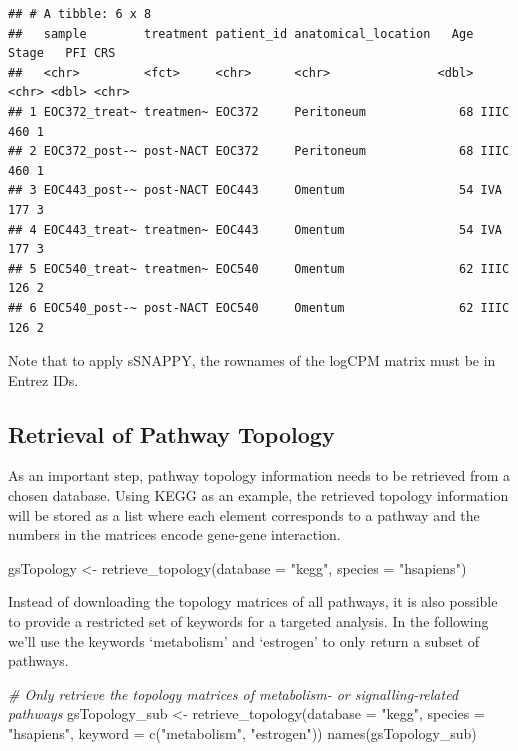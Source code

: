 \documentclass[9pt,a4paper,]{extarticle}
\newenvironment{Shaded}{\begin{snugshade}}{\end{snugshade}}
\newcommand{\AttributeTok}[1]{\textcolor[rgb]{0.77,0.63,0.00}{#1}}
\newcommand{\CommentTok}[1]{\textcolor[rgb]{0.56,0.35,0.01}{\textit{#1}}}
\newcommand{\FunctionTok}[1]{\textcolor[rgb]{0.00,0.00,0.00}{#1}}
\newcommand{\NormalTok}[1]{#1}
\newcommand{\OtherTok}[1]{\textcolor[rgb]{0.56,0.35,0.01}{#1}}
\newcommand{\StringTok}[1]{\textcolor[rgb]{0.31,0.60,0.02}{#1}}
\begin{document}
\begin{verbatim}
## # A tibble: 6 x 8
##   sample        treatment patient_id anatomical_location   Age Stage   PFI CRS  
##   <chr>         <fct>     <chr>      <chr>               <dbl> <chr> <dbl> <chr>
## 1 EOC372_treat~ treatmen~ EOC372     Peritoneum             68 IIIC    460 1    
## 2 EOC372_post-~ post-NACT EOC372     Peritoneum             68 IIIC    460 1    
## 3 EOC443_post-~ post-NACT EOC443     Omentum                54 IVA     177 3    
## 4 EOC443_treat~ treatmen~ EOC443     Omentum                54 IVA     177 3    
## 5 EOC540_treat~ treatmen~ EOC540     Omentum                62 IIIC    126 2    
## 6 EOC540_post-~ post-NACT EOC540     Omentum                62 IIIC    126 2
\end{verbatim}

Note that to apply sSNAPPY, the rownames of the logCPM matrix must be in Entrez IDs.

\hypertarget{retrieval-of-pathway-topology}{%
\subsection{Retrieval of Pathway Topology}\label{retrieval-of-pathway-topology}}

As an important step, pathway topology information needs to be retrieved from a chosen database.
Using KEGG as an example, the retrieved topology information will be stored as a list where each element corresponds to a pathway and the numbers in the matrices encode gene-gene interaction.

\begin{Shaded}
\begin{Highlighting}[]
\NormalTok{gsTopology }\OtherTok{\textless{}{-}} \FunctionTok{retrieve\_topology}\NormalTok{(}\AttributeTok{database =} \StringTok{"kegg"}\NormalTok{, }\AttributeTok{species =} \StringTok{"hsapiens"}\NormalTok{)}
\end{Highlighting}
\end{Shaded}

Instead of downloading the topology matrices of all pathways, it is also possible to provide a restricted set of keywords for a targeted analysis.
In the following we'll use the keywords `metabolism' and `estrogen' to only return a subset of pathways.

\begin{Shaded}
\begin{Highlighting}[]
\CommentTok{\# Only retrieve the topology matrices of metabolism{-} or signalling{-}related pathways}
\NormalTok{gsTopology\_sub }\OtherTok{\textless{}{-}} \FunctionTok{retrieve\_topology}\NormalTok{(}\AttributeTok{database =} \StringTok{"kegg"}\NormalTok{, }\AttributeTok{species =} \StringTok{"hsapiens"}\NormalTok{, }
                                    \AttributeTok{keyword =} \FunctionTok{c}\NormalTok{(}\StringTok{"metabolism"}\NormalTok{, }\StringTok{"estrogen"}\NormalTok{))}
\FunctionTok{names}\NormalTok{(gsTopology\_sub)}
\end{Highlighting}
\end{Shaded}
\end{document}
